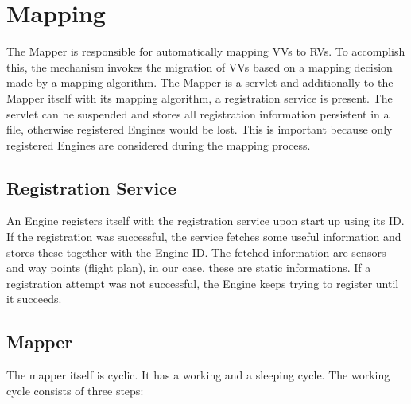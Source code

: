 \section{Mapping}
The Mapper is responsible for automatically mapping \acp{VV} to \acp{RV}. To accomplish this, the mechanism invokes 
the migration of \acp{VV} based on a mapping decision made by a mapping algorithm. The Mapper is a servlet and
additionally to the Mapper itself with its mapping algorithm, a registration service is present. The servlet can be suspended and stores all
registration information persistent in a file, otherwise registered Engines would be lost. This is important because only registered 
Engines are considered during the mapping process.

\subsection{Registration Service}
An Engine registers itself with the registration service upon start up using its ID. If the registration was successful, the service
fetches some useful information and stores these together with the Engine ID. The fetched information are sensors and 
way points (flight plan), in our case, these are static informations. If a registration attempt was not successful, the Engine 
keeps trying to register until it succeeds.

\subsection{Mapper}
The mapper itself is cyclic. It has a working and a sleeping cycle.
The working cycle consists of three steps:


